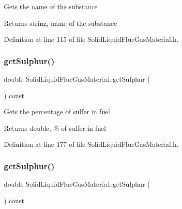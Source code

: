 Gets the name of the substance \begin{DoxyReturn}{Returns}
string, name of the substance 
\end{DoxyReturn}


Definition at line 115 of file Solid\+Liquid\+Flue\+Gas\+Material.\+h.

\mbox{\label{class_solid_liquid_flue_gas_material_abe35d8ff283bfa5aadcf00f9906025ae}} 
\subsubsection{\texorpdfstring{get\+Sulphur()}{getSulphur()}\hspace{0.1cm}{\footnotesize\ttfamily [1/3]}}
{\footnotesize\ttfamily double Solid\+Liquid\+Flue\+Gas\+Material\+::get\+Sulphur (\begin{DoxyParamCaption}{ }\end{DoxyParamCaption}) const\hspace{0.3cm}{\ttfamily [inline]}}

Gets the percentage of sulfer in fuel \begin{DoxyReturn}{Returns}
double, \% of sulfer in fuel 
\end{DoxyReturn}


Definition at line 177 of file Solid\+Liquid\+Flue\+Gas\+Material.\+h.

\mbox{\label{class_solid_liquid_flue_gas_material_abe35d8ff283bfa5aadcf00f9906025ae}} 
\subsubsection{\texorpdfstring{get\+Sulphur()}{getSulphur()}\hspace{0.1cm}{\footnotesize\ttfamily [2/3]}}
{\footnotesize\ttfamily double Solid\+Liquid\+Flue\+Gas\+Material\+::get\+Sulphur (\begin{DoxyParamCaption}{ }\end{DoxyParamCaption}) const\hspace{0.3cm}{\ttfamily [inline]}}

